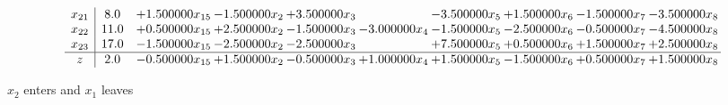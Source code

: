 \documentclass[10pt]{article}
\begin{document}
\[\begin{array}{c| c c@{\hskip 2pt} c@{\hskip 2pt} c@{\hskip 2pt} c@{\hskip 2pt} c@{\hskip 2pt} c@{\hskip 2pt} c@{\hskip 2pt} c@{\hskip 2pt} }
 x_{21}   &  8.0 & + 1.500000 x_{15} & -1.500000 x_{2} & + 3.500000 x_{3} &   & -3.500000 x_{5} & + 1.500000 x_{6} & -1.500000 x_{7} & -3.500000 x_{8}\\
 x_{22}   &  11.0 & + 0.500000 x_{15} & + 2.500000 x_{2} & -1.500000 x_{3} & -3.000000 x_{4} & -1.500000 x_{5} & -2.500000 x_{6} & -0.500000 x_{7} & -4.500000 x_{8}\\
 x_{23}   &  17.0 & -1.500000 x_{15} & -2.500000 x_{2} & -2.500000 x_{3} &   & + 7.500000 x_{5} & + 0.500000 x_{6} & + 1.500000 x_{7} & + 2.500000 x_{8}\\
\hline
z    &  2.0 & -0.500000 x_{15} & + 1.500000 x_{2} & -0.500000 x_{3} & + 1.000000 x_{4} & + 1.500000 x_{5} & -1.500000 x_{6} & + 0.500000 x_{7} & + 1.500000 x_{8}\\
\end{array}\]


 $ x_{2} $ enters and $ x_{1} $ leaves 
\end{document}
